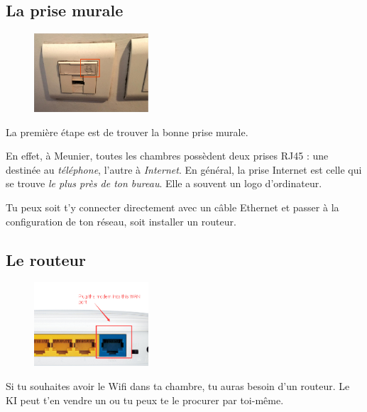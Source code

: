 \documentclass{../templates/enpc-ki/ki020}
\begin{document}
  \newpage
    \Header{}


    \tableofcontents

  \newpage
    \vspace{0.5cm}
    \subsection{La prise murale}
    \begin{figure}
      \centering
      \includegraphics[width=0.38\textwidth]{page6}
    \end{figure}
    La première étape est de trouver la bonne prise murale.

    En effet, à Meunier, toutes les chambres possèdent deux prises RJ45 : une destinée au \emph{téléphone}, l'autre à \emph{Internet}. En général, la prise Internet est celle qui se trouve \emph{le plus près de ton bureau}. Elle a souvent un logo d'ordinateur.

    Tu peux soit t’y connecter directement avec un câble Ethernet et passer à la configuration de ton réseau, soit installer un routeur. %


\bigskip
    \subsection{Le routeur}
    \begin{figure}
      \centering
      \includegraphics[width=0.38\textwidth]{page7}
    \end{figure}
    Si tu souhaites avoir le Wifi dans ta chambre, tu auras besoin d’un routeur. Le KI peut t'en vendre un ou tu peux te le procurer par toi-même.
\end{document}
